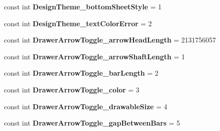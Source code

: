 \begin{DoxyCompactItemize}
\item 
\mbox{\label{classst_delivery_1_1_resource_1_1_styleable_aef09f3490a5748231d02f9e2d033358f}} 
const int {\bfseries Design\+Theme\+\_\+bottom\+Sheet\+Style} = 1
\item 
\mbox{\label{classst_delivery_1_1_resource_1_1_styleable_ac1675d86c404b017e585cb3364558b1f}} 
const int {\bfseries Design\+Theme\+\_\+text\+Color\+Error} = 2
\item 
\mbox{\label{classst_delivery_1_1_resource_1_1_styleable_ac7fe0a907183f5dacd02acee5772cb0a}} 
const int {\bfseries Drawer\+Arrow\+Toggle\+\_\+arrow\+Head\+Length} = 2131756057
\item 
\mbox{\label{classst_delivery_1_1_resource_1_1_styleable_a60eed57007e2d5dcb153e30ba5f06ec3}} 
const int {\bfseries Drawer\+Arrow\+Toggle\+\_\+arrow\+Shaft\+Length} = 1
\item 
\mbox{\label{classst_delivery_1_1_resource_1_1_styleable_ad6324a81739168bf3bd2ab6a18794ba5}} 
const int {\bfseries Drawer\+Arrow\+Toggle\+\_\+bar\+Length} = 2
\item 
\mbox{\label{classst_delivery_1_1_resource_1_1_styleable_aeaeffec4fb11c4e36eb51ae3f560eeb7}} 
const int {\bfseries Drawer\+Arrow\+Toggle\+\_\+color} = 3
\item 
\mbox{\label{classst_delivery_1_1_resource_1_1_styleable_aefdd7dc2aabda5e9a4c8abc80fffc512}} 
const int {\bfseries Drawer\+Arrow\+Toggle\+\_\+drawable\+Size} = 4
\item 
\mbox{\label{classst_delivery_1_1_resource_1_1_styleable_ae257a3b1632dc32d727c51771219ca48}} 
const int {\bfseries Drawer\+Arrow\+Toggle\+\_\+gap\+Between\+Bars} = 5
\item 
\mbox{\label{classst_delivery_1_1_resource_1_1_styleable_ac3da4a0012691a32367ba4e3e84a88ac}} 

\end{DoxyCompactItemize}
